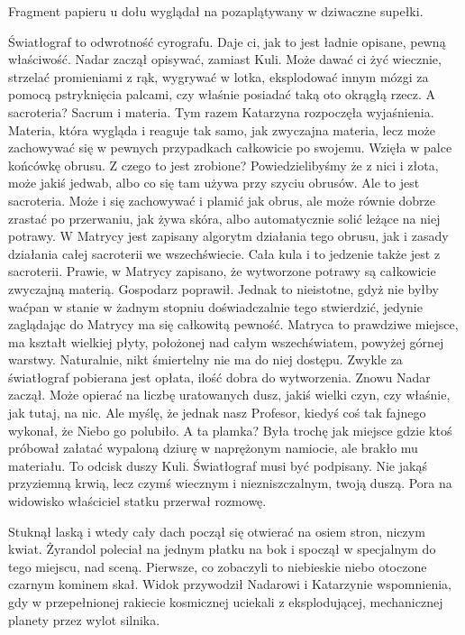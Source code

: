 Fragment papieru u dołu wyglądał na pozaplątywany w dziwaczne supełki.

\begin{dialogue}
\ds{} Światłograf to odwrotność cyrografu. Daje ci, jak to jest ładnie opisane, pewną właściwość. \dm{} Nadar zaczął opisywać, zamiast Kuli. \dm{}
Może dawać ci żyć wiecznie, strzelać promieniami z rąk, wygrywać w lotka, eksplodować innym mózgi za pomocą pstryknięcia palcami, czy właśnie posiadać taką oto okrągłą rzecz.
\ds{} A sacroteria? 
\ds{} Sacrum i materia. \dm{} Tym razem Katarzyna rozpoczęła wyjaśnienia. \dm{} 
Materia, która wygląda i reaguje tak samo, jak zwyczajna materia, lecz może zachowywać się w pewnych przypadkach całkowicie po swojemu. \dm{} 
Wzięła w palce końcówkę obrusu. \dm{} Z czego to jest zrobione? 
Powiedzielibyśmy że z nici i złota, może jakiś jedwab, albo co się tam używa przy szyciu obrusów.
Ale to jest sacroteria. Może i się zachowywać i plamić jak obrus, ale może równie dobrze zrastać po przerwaniu, jak żywa skóra, albo automatycznie solić leżące na niej potrawy.
W Matrycy jest zapisany algorytm działania tego obrusu, jak i zasady działania całej sacroterii we wszechświecie. 
Cała kula i to jedzenie także jest z sacroterii.
\ds{} Prawie, w Matrycy zapisano, że wytworzone potrawy są całkowicie zwyczajną materią. \dm{} Gospodarz poprawił. \dm{}
Jednak to nieistotne, gdyż nie byłby waćpan w stanie w żadnym stopniu doświadczalnie tego stwierdzić, jedynie zaglądając do Matrycy ma się całkowitą pewność. 
Matryca to prawdziwe miejsce, ma kształt wielkiej płyty, położonej nad całym wszechświatem, powyżej górnej warstwy. Naturalnie, nikt śmiertelny nie ma do niej dostępu.
\ds{} Zwykle za światłograf pobierana jest opłata, ilość dobra do wytworzenia. \dm{} Znowu Nadar zaczął. \dm{} 
Może opierać na liczbę uratowanych dusz, jakiś wielki czyn, czy właśnie, jak tutaj, na nic. 
Ale myślę, że jednak nasz Profesor, kiedyś coś tak fajnego wykonał, że Niebo go polubiło.
\ds{} A ta plamka? \dm{} Była trochę jak miejsce gdzie ktoś próbował załatać wypaloną dziurę w naprężonym namiocie, ale brakło mu materiału.
\ds{} To odcisk duszy Kuli. Światłograf musi być podpisany. Nie jakąś przyziemną krwią, lecz czymś wiecznym i niezniszczalnym, twoją duszą.
\ds{} Pora na widowisko \dm{} właściciel statku przerwał rozmowę.
\end{dialogue}

Stuknął laską i wtedy cały dach począł się otwierać na osiem stron, niczym kwiat. 
Żyrandol poleciał na jednym płatku na bok i spoczął w specjalnym do tego miejscu, nad sceną.
Pierwsze, co zobaczyli to niebieskie niebo otoczone czarnym kominem skał.
Widok przywodził Nadarowi i Katarzynie wspomnienia, gdy w przepełnionej rakiecie kosmicznej uciekali z eksplodującej, mechanicznej planety przez wylot silnika.

